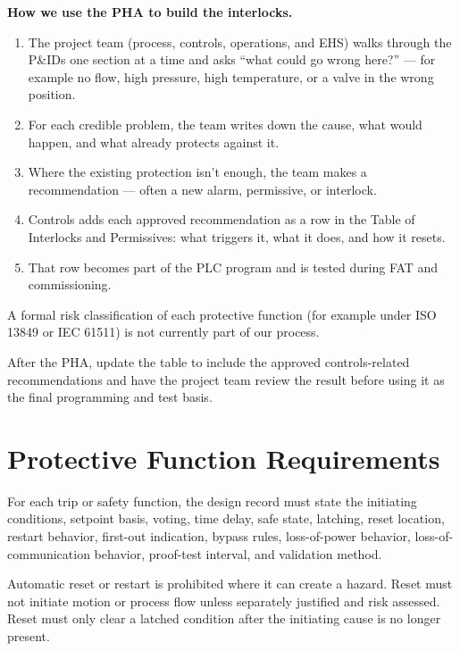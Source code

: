 \textbf{How we use the PHA to build the interlocks.}
\begin{enumerate}[itemsep=2pt]
  \item The project team (process, controls, operations, and EHS) walks through the P\&IDs one section at a time and asks ``what could go wrong here?'' --- for example no flow, high pressure, high temperature, or a valve in the wrong position.
  \item For each credible problem, the team writes down the cause, what would happen, and what already protects against it.
  \item Where the existing protection isn't enough, the team makes a recommendation --- often a new alarm, permissive, or interlock.
  \item Controls adds each approved recommendation as a row in the Table of Interlocks and Permissives: what triggers it, what it does, and how it resets.
  \item That row becomes part of the PLC program and is tested during FAT and commissioning.
\end{enumerate}
A formal risk classification of each protective function (for example under ISO 13849 or IEC 61511) is not currently part of our process.

After the PHA, update the table to include the approved controls-related recommendations and have the project team review the result before using it as the final programming and test basis.

\section{Protective Function Requirements}\label{sec:protective-function-reqs}

For each trip or safety function, the design record must state the initiating conditions, setpoint basis, voting, time delay, safe state, latching, reset location, restart behavior, first-out indication, bypass rules, loss-of-power behavior, loss-of-communication behavior, proof-test interval, and validation method.

Automatic reset or restart is prohibited where it can create a hazard. Reset must not initiate motion or process flow unless separately justified and risk assessed. Reset must only clear a latched condition after the initiating cause is no longer present.

